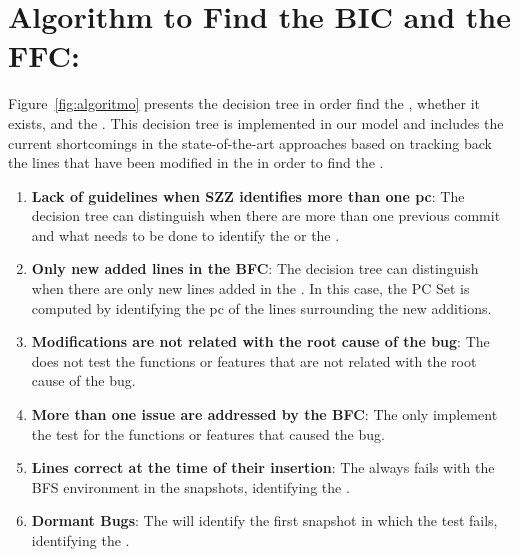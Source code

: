 \documentclass[a4paper, 12pt]{book}
\begin{document}
\section{Algorithm to Find the BIC and the FFC:}
Figure~\ref{fig:algoritmo} presents the decision tree in order find the \BIC, whether it exists, and the \FFC. This decision tree is implemented in our model and includes the current shortcomings in the state-of-the-art approaches based on tracking back the lines that have been modified in the \BFC in order to find the \BIC.

 \begin{enumerate}
	\item {\textbf{Lack of guidelines when SZZ identifies more than one pc}}: The decision tree can distinguish when there are more than one previous commit and what needs to be done to identify the \BIC or the \FFC.
	\item {\textbf{Only new added lines in the BFC}}: The decision tree can distinguish when there are only new lines added in the \BFC. In this case, the PC Set is computed by identifying the pc of the lines surrounding the new additions. 
	\item {\textbf{Modifications are not related with the root cause of the bug}}: The \TSB does not test the functions or features that are not related with the root cause of the bug.
	\item{\textbf{ More than one issue are addressed by the BFC}}: The \TSB only implement the test for the functions or features that caused the bug.
	\item {\textbf{Lines correct at the time of their insertion}}: The \TSB always fails with the BFS environment in the snapshots, identifying the \FFC.
	\item {\textbf{Dormant Bugs}}: The \TSB will identify the first snapshot in which the test fails, identifying the \BIC.

\end{enumerate}
\end{document}
